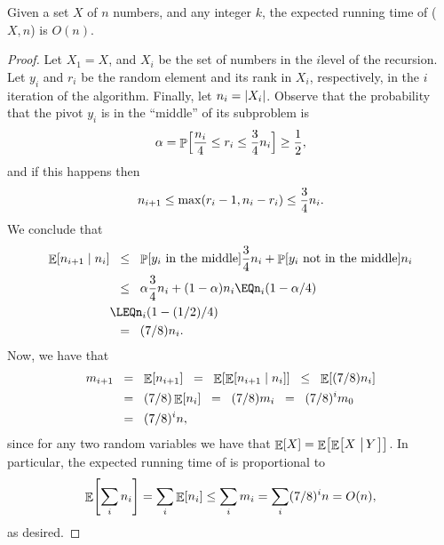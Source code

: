 \begin{theorem}
    Given a set $X$ of $n$ numbers, and any integer $k$, the expected
    running time of \QuickSelect{}($X, n$) is $O(n)$.
\end{theorem}
\begin{proof}
    Let $X_1 = X$, and $X_i$ be the set of numbers in the $i$\th level
    of the recursion. Let $y_i$ and $r_i$ be the random element and
    its rank in $X_i$, respectively, in the $i$\th iteration of the
    algorithm. Finally, let $n_i = \left| {X_i} \right|$. Observe that the
    probability that the pivot $y_i$ is in the ``middle'' of its
    subproblem is
    \begin{align*}
      \alpha = \Prob{\smash{ \frac{n_i}{4} \leq r_i \leq \frac{3}{4}
      n_i} \Bigr.}
      \geq \frac{1}{2},
    \end{align*}
    and if this happens then
    \begin{align*}
        n_{i+1} \leq \max\pth{ r_i-1, n_{i} - r_i } \leq
        \frac{3}{4}n_i.
    \end{align*}
    We conclude that 
    \begin{align*}
      \ExCond{ n_{i+1}}{ n_i}%
      &\LEQ %
        \Prob{\MakeBig y_i\text{ in the middle}} \frac{3}{4} n_i +
        \Prob{\MakeBig y_i\text{ not in the middle}}
        n_i\\
        &\LEQ%
        \alpha \frac{3}{4}n_i + \pth[]{1-\alpha} n_i%
        \EQ%
        n_i \pth{ 1 - \alpha / 4}%
        \\&
        \LEQ%
        n_i \pth{ 1 - (1/2) / 4}%
        \\&
        \EQ %
        (7/8) n_i.
    \end{align*}
    Now, we have that 
    \begin{align*}
      m_{i+1}%
      &\EQ%
        \Ex{n_{i+1}\MakeBig}%
        \EQ%
        \Ex{\ExCond{ n_{i+1}}{ n_i}}%
        \LEQ%
        \Ex{(7/8)n_i}%
        \\&
        \EQ %
        (7/8) \Ex{n_i}
        \EQ%
        (7/8) m_i
        \EQ%
        (7/8)^i m_0
        \\&%
        \EQ
        (7/8)^i n,
    \end{align*}
    since for any two random variables we have that $\mathop{\mathbb{E}}\!\left[ {X} \right] =
    \mathop{\mathbb{E}}\!\left[ {\mathop{\mathbb{E}}\!\left[ {X \,\left|\, { Y} \bigr.\right. } \right]} \right]$. In particular, the expected running time
    of \QuickSelect is proportional to
    \begin{align*}
        \Ex{\sum_i n_i }%
        =%
        \sum_i \Ex{ \MakeBig n_i} %
        \leq%
        \sum_i m_i = \sum_i (7/8)^i n = O(n),
    \end{align*}
    as desired.
\end{proof}

